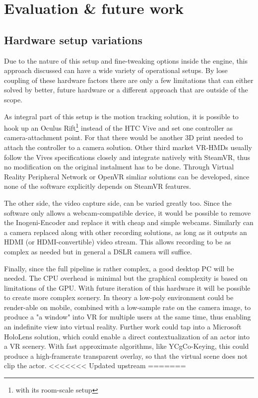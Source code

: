 %
\chapter{Evaluation \& future work}

\section{Hardware setup variations}

Due to the nature of this setup and fine-tweaking options inside the engine, 
this approach discussed can have a wide variety of operational setups. By lose 
coupling of these hardware factors there are only a few limitations that can 
either solved by better, future hardware or a different approach that are 
outside of the scope.

As integral part of this setup is the motion tracking solution, it is possible 
to hook up an Oculus Rift\footnote{with its room-scale setup} instead of the 
HTC Vive and set one controller as camera-attachment point. For that there 
would be another 3D print needed to attach the controller to a camera solution. 
\newline
Other third market VR-HMDs usually follow the Vives specifications closely and 
integrate natively with SteamVR, thus no modification on the original 
instalment has to be done.
\newline
Through Virtual Reality Peripheral Network or OpenVR simliar solutions can be 
developed, since none of the software explicitly depends on SteamVR features.

The other side, the video capture side, can be varied greatly too. Since the 
software only allows a webcam-compatible device, it would be possible to remove 
the Inogeni-Encoder and replace it with cheap and simple webcams. Similarly can 
a camera replaced along with other recording solutions, as long as it outputs 
an HDMI (or HDMI-convertible) video stream. This allows recording to be as 
complex as needed but in general a DSLR camera will suffice.

Finally, since the full pipeline is rather complex, a good desktop PC will be 
needed. The CPU overhead is minimal but the graphical complexity is based on 
limitations of the GPU. With future iteration of this hardware it will be 
possible to create more complex scenery.
In theory a low-poly environment could be render-able on mobile, combined with 
a low-sample rate on the camera image, to produce a "a window" into VR for 
multiple users at the same time, thus enabling an indefinite view into virtual 
reality. Further work could tap into a Microsoft HoloLens solution, which could 
enable a direct contextualization of an actor into a VR scenery. With fast 
approximate algorithms, like YCgCo-Keying, this could produce a high-framerate 
transparent overlay, so that the virtual scene does not clip the actor.
<<<<<<< Updated upstream
=======

